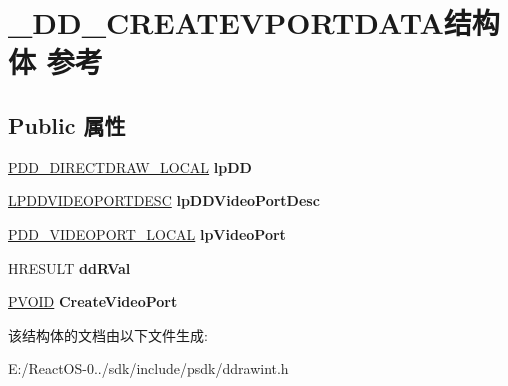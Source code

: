 \hypertarget{struct___d_d___c_r_e_a_t_e_v_p_o_r_t_d_a_t_a}{}\section{\+\_\+\+D\+D\+\_\+\+C\+R\+E\+A\+T\+E\+V\+P\+O\+R\+T\+D\+A\+T\+A结构体 参考}
\label{struct___d_d___c_r_e_a_t_e_v_p_o_r_t_d_a_t_a}
\subsection*{Public 属性}
\begin{DoxyCompactItemize}
\item 
\mbox{\label{struct___d_d___c_r_e_a_t_e_v_p_o_r_t_d_a_t_a_a72fc31bdabbc561489610a8950f67dc7}} 
\hyperlink{struct___d_d___d_i_r_e_c_t_d_r_a_w___l_o_c_a_l}{P\+D\+D\+\_\+\+D\+I\+R\+E\+C\+T\+D\+R\+A\+W\+\_\+\+L\+O\+C\+AL} {\bfseries lp\+DD}
\item 
\mbox{\label{struct___d_d___c_r_e_a_t_e_v_p_o_r_t_d_a_t_a_a1421c223c48758a97989cba845787fa9}} 
\hyperlink{struct___d_d_v_i_d_e_o_p_o_r_t_d_e_s_c}{L\+P\+D\+D\+V\+I\+D\+E\+O\+P\+O\+R\+T\+D\+E\+SC} {\bfseries lp\+D\+D\+Video\+Port\+Desc}
\item 
\mbox{\label{struct___d_d___c_r_e_a_t_e_v_p_o_r_t_d_a_t_a_ab0fc5dd29da315da73247eb73727aa80}} 
\hyperlink{struct___d_d___v_i_d_e_o_p_o_r_t___l_o_c_a_l}{P\+D\+D\+\_\+\+V\+I\+D\+E\+O\+P\+O\+R\+T\+\_\+\+L\+O\+C\+AL} {\bfseries lp\+Video\+Port}
\item 
\mbox{\label{struct___d_d___c_r_e_a_t_e_v_p_o_r_t_d_a_t_a_a34064664cee615a1cbf712d4b7a3792a}} 
H\+R\+E\+S\+U\+LT {\bfseries dd\+R\+Val}
\item 
\mbox{\label{struct___d_d___c_r_e_a_t_e_v_p_o_r_t_d_a_t_a_a94c60ddc0f5f5bf2ba85bb7e70a9b40a}} 
\hyperlink{interfacevoid}{P\+V\+O\+ID} {\bfseries Create\+Video\+Port}
\end{DoxyCompactItemize}


该结构体的文档由以下文件生成\+:\begin{DoxyCompactItemize}
\item 
E\+:/\+React\+O\+S-\/0../sdk/include/psdk/ddrawint.\+h\end{DoxyCompactItemize}
